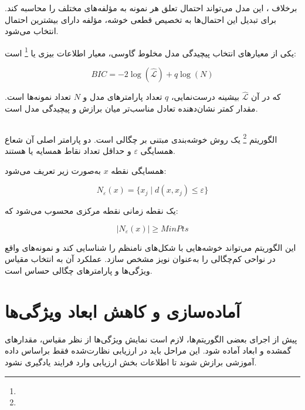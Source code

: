 برخلاف
،
این مدل می‌تواند احتمال تعلق هر نمونه به مؤلفه‌های مختلف را محاسبه کند. برای تبدیل این احتمال‌ها به تخصیص قطعی خوشه، مؤلفه دارای بیشترین احتمال انتخاب می‌شود.

یکی از معیارهای انتخاب پیچیدگی مدل مخلوط گاوسی، معیار اطلاعات بیزی یا
\footnote{}
است:

\begin{equation}
BIC
=
-2\log(\hat{\mathcal{L}})
+
q\log(N)
\end{equation}

که در آن $\hat{\mathcal{L}}$ بیشینه درست‌نمایی، $q$ تعداد پارامترهای مدل و $N$ تعداد نمونه‌ها است. مقدار کمتر
نشان‌دهنده تعادل مناسب‌تر میان برازش و پیچیدگی مدل است.


\subsection{}

الگوریتم
\footnote{}
یک روش خوشه‌بندی مبتنی بر چگالی است. دو پارامتر اصلی آن شعاع همسایگی $\varepsilon$ و حداقل تعداد نقاط همسایه یا
هستند.

همسایگی نقطه $x$ به‌صورت زیر تعریف می‌شود:

\begin{equation}
N_{\varepsilon}(x)
=
\{x_j\mid d(x,x_j)\leq\varepsilon\}
\end{equation}

یک نقطه زمانی نقطه مرکزی محسوب می‌شود که:

\begin{equation}
|N_{\varepsilon}(x)|
\geq
MinPts
\end{equation}

این الگوریتم می‌تواند خوشه‌هایی با شکل‌های نامنظم را شناسایی کند و نمونه‌های واقع در نواحی کم‌چگالی را به‌عنوان نویز مشخص سازد. عملکرد آن به انتخاب مقیاس ویژگی‌ها و پارامترهای چگالی حساس است.


\section{آماده‌سازی و کاهش ابعاد ویژگی‌ها}

پیش از اجرای بعضی الگوریتم‌ها، لازم است نمایش ویژگی‌ها از نظر مقیاس، مقدارهای گمشده و ابعاد آماده شود. این مراحل باید در ارزیابی نظارت‌شده فقط براساس داده آموزشی برازش شوند تا اطلاعات بخش ارزیابی وارد فرایند یادگیری نشود.


